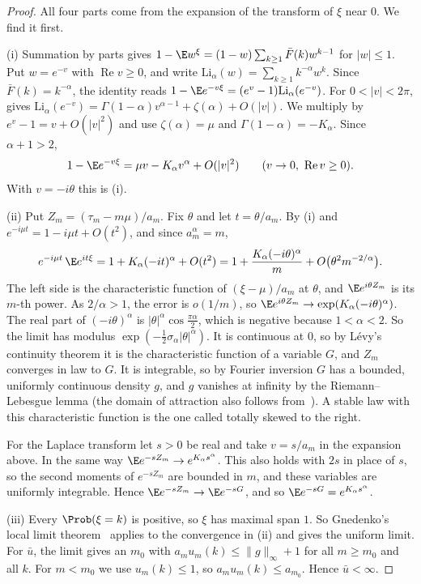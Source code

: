 \begin{proof}
All four parts come from the expansion of the transform of $\xi$ near $0$. We
find it first.

(i) Summation by parts gives $1-\E w^\xi=(1-w)\sum_{k\ge1}\bar F(k)w^{k-1}$
for $\lvert w\rvert\le1$. Put $w=e^{-v}$ with $\operatorname{Re}v\ge0$, and
write $\mathrm{Li}_\alpha(w)=\sum_{k\ge1}k^{-\alpha}w^k$. Since
$\bar F(k)=k^{-\alpha}$, the identity reads
$1-\E e^{-v\xi}=(e^v-1)\mathrm{Li}_\alpha(e^{-v})$. For
$0<\lvert v\rvert<2\pi$, \cite[25.12.12]{dlmf} gives
$\mathrm{Li}_\alpha(e^{-v})=\Gamma(1-\alpha)v^{\alpha-1}+\zeta(\alpha)+O(\lvert
v\rvert)$. We multiply by $e^v-1=v+O(\lvert v\rvert^2)$ and use
$\zeta(\alpha)=\mu$ and $\Gamma(1-\alpha)=-K_\alpha$. Since $\alpha+1>2$,
\[
 1-\E e^{-v\xi}=\mu v-K_\alpha v^\alpha+O(\lvert v\rvert^2)
 \qquad(v\to0,\ \operatorname{Re}v\ge0).
\]
With $v=-i\theta$ this is (i).

(ii) Put $Z_m=(\tau_m-m\mu)/a_m$. Fix $\theta$ and let $t=\theta/a_m$. By (i)
and $e^{-i\mu t}=1-i\mu t+O(t^2)$, and since $a_m^\alpha=m$,
\[
 e^{-i\mu t}\,\E e^{it\xi}=1+K_\alpha(-it)^\alpha+O(t^2)
 =1+\frac{K_\alpha(-i\theta)^\alpha}m+O\bigl(\theta^2m^{-2/\alpha}\bigr).
\]
The left side is the characteristic function of $(\xi-\mu)/a_m$ at $\theta$,
and $\E e^{i\theta Z_m}$ is its $m$-th power. As $2/\alpha>1$, the error is
$o(1/m)$, so $\E e^{i\theta Z_m}\to\exp(K_\alpha(-i\theta)^\alpha)$. The
real part of $(-i\theta)^\alpha$ is
$\lvert\theta\rvert^\alpha\cos\frac{\pi\alpha}2$, which is negative because
$1<\alpha<2$. So the limit has modulus
$\exp(-\frac12\sigma_\alpha\lvert\theta\rvert^\alpha)$. It is continuous at
$0$, so by L\'evy's continuity theorem it is the characteristic function of a
variable $G$, and $Z_m$ converges in law to $G$. It is integrable, so by
Fourier inversion $G$ has a bounded, uniformly continuous density $g$, and
$g$ vanishes at infinity by the Riemann--Lebesgue lemma (the domain of
attraction also follows from~\cite[Theorem~XVII.5.2]{feller1971}). A stable
law with this characteristic function is the one called totally skewed to
the right.

For the Laplace transform let $s>0$ be real and take $v=s/a_m$ in the
expansion above. In the same way
$\E e^{-sZ_m}\to e^{K_\alpha s^\alpha}$. This also holds with $2s$ in place of
$s$, so the second moments of $e^{-sZ_m}$ are bounded in $m$, and these
variables are uniformly integrable. Hence $\E e^{-sZ_m}\to\E e^{-sG}$, and so
$\E e^{-sG}=e^{K_\alpha s^\alpha}$.

(iii) Every $\Prob(\xi=k)$ is positive, so $\xi$ has maximal span $1$. So
Gnedenko's local limit theorem~\cite[Chapter~4]{ibragimovlinnik1971} applies
to the convergence in (ii) and gives the uniform limit. For $\bar u$, the
limit gives an $m_0$ with $a_mu_m(k)\le\lVert g\rVert_\infty+1$ for all
$m\ge m_0$ and all $k$. For $m<m_0$ we use $u_m(k)\le1$, so
$a_mu_m(k)\le a_{m_0}$. Hence $\bar u<\infty$.


\end{proof}

